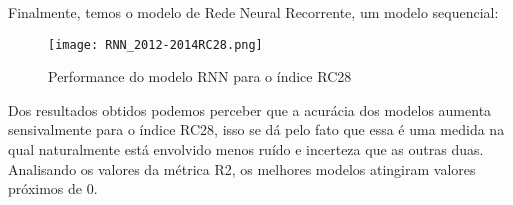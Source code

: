 Finalmente, temos o modelo de Rede Neural Recorrente, um modelo sequencial:

\begin{figure}[H]
\centering
\texttt{[image: RNN\_2012-2014RC28.png]}
\caption{Performance do modelo RNN para o índice RC28}
\end{figure}


Dos resultados obtidos podemos perceber que a acurácia dos modelos aumenta sensivalmente para o índice RC28, isso se dá pelo fato que essa é uma medida na qual naturalmente está envolvido menos ruído e incerteza que as outras duas. Analisando os valores da métrica R2, os melhores modelos atingiram valores próximos de $0$.

